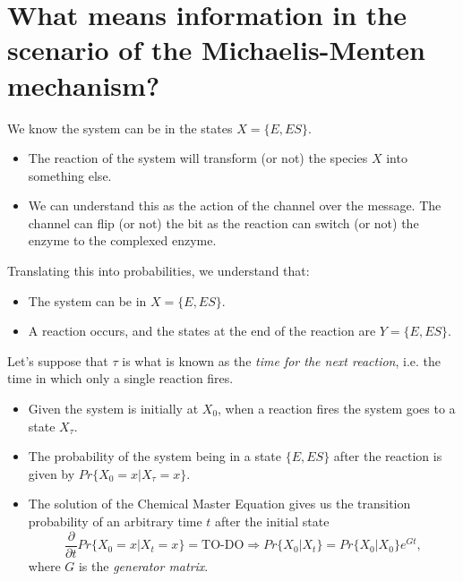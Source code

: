 \documentclass[11pt]{amsart}
\begin{document}
\section{What means information in the scenario of the Michaelis-Menten mechanism?}

We know the system can be in the states $X = \{E, ES\}$.
\begin{itemize}
\item The reaction of the system will transform (or not) the species $X$ into something else.
\item We can understand this as the action of the channel over the message. The channel can flip (or not) the bit as the reaction can switch (or not) the enzyme to the complexed enzyme.
\end{itemize}

Translating this into probabilities, we understand that:
\begin{itemize}
\item The system can be in $X = \{E, ES\}$.
\item A reaction occurs, and the states at the end of the reaction are $Y = \{E, ES\}$.
\end{itemize}

\vspace{10pt}
Let's suppose that $\tau$ is what is known as the {\it time for the next reaction}, i.e. the time in which only a single reaction fires.

\begin{itemize}
\item Given the system is initially at $X_0$, when a reaction fires the system goes to a state $X_\tau$.
\item The probability of the system being in a state $\{E, ES\}$ after the reaction is given by $Pr\{X_0 = x | X_\tau = x\}$.
\item The solution of the Chemical Master Equation gives us the transition probability of an arbitrary time $t$ after the initial state
$$\frac{\partial}{\partial t} Pr\{X_0 = x | X_t = x\} = \text{TO-DO} \Rightarrow Pr\{X_0 | X_t \} = Pr\{X_0 | X_0 \} e^{Gt},$$
where $G$ is the {\it generator matrix}.
\end{itemize}
\end{document}

